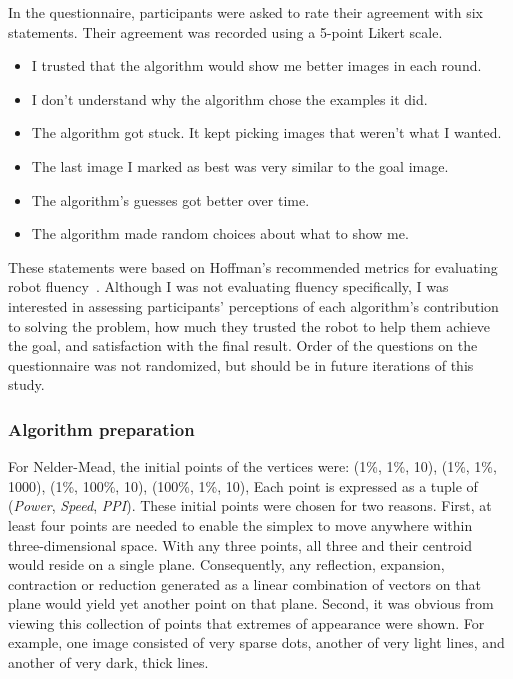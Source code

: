 In the questionnaire, participants were asked to rate their agreement with six statements.
Their agreement was recorded using a 5-point Likert scale.
\begin{itemize}[noitemsep]
\item I trusted that the algorithm would show me better images in each round.
\item I don't understand why the algorithm chose the examples it did.
\item The algorithm got stuck.  It kept picking images that weren't what I wanted.
\item The last image I marked as best was very similar to the goal image.
\item The algorithm's guesses got better over time.
\item The algorithm made random choices about what to show me.
\end{itemize}
These statements were based on Hoffman's recommended metrics for evaluating robot fluency~\cite{hoffman_evaluating_2013}.
Although I was not evaluating fluency specifically, I was interested in assessing participants' perceptions of each algorithm's contribution to solving the problem, how much they trusted the robot to help them achieve the goal, and satisfaction with the final result.
Order of the questions on the questionnaire was not randomized, but should be in future iterations of this study.

\subsubsection{Algorithm preparation}

For Nelder-Mead, the initial points of the vertices were:
(1\%, 1\%, 10),
(1\%, 1\%, 1000),
(1\%, 100\%, 10),
(100\%, 1\%, 10),
Each point is expressed as a tuple of (\emph{Power}, \emph{Speed}, \emph{PPI}).
These initial points were chosen for two reasons.
First, at least four points are needed to enable the simplex to move anywhere within three-dimensional space.
With any three points, all three and their centroid would reside on a single plane.
Consequently, any reflection, expansion, contraction or reduction generated as a linear combination of vectors on that plane would yield yet another point on that plane.
Second, it was obvious from viewing this collection of points that extremes of appearance were shown.
For example, one image consisted of very sparse dots, another of very light lines, and another of very dark, thick lines.

